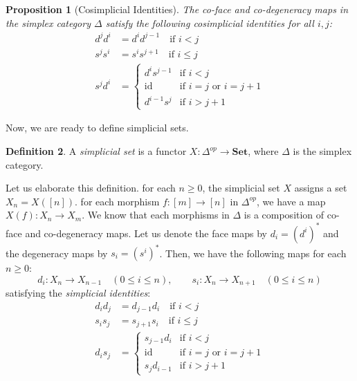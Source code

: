 \documentclass[11pt]{article}
\theoremstyle{definition}
\newtheorem{definition}{Definition}[section]
\theoremstyle{plain}
\newtheorem{proposition}[definition]{Proposition}
\begin{document}
\begin{proposition}[Cosimplicial Identities]
    The co-face and co-degeneracy maps in the simplex category $\Delta$ satisfy the following \emph{cosimplicial identities} for all $i, j$:
    \begin{align*}
        d^j d^i & = d^i d^{j-1} \quad \text{if } i < j      \\
        s^j s^i & = s^{i} s^{j+1} \quad \text{if } i \leq j \\
        s^j d^i & =
        \begin{cases}
            d^i s^{j-1} & \text{if } i < j                     \\
            \mathrm{id} & \text{if } i = j \text{ or } i = j+1 \\
            d^{i-1} s^j & \text{if } i > j+1
        \end{cases}
    \end{align*}
\end{proposition}


Now, we are ready to define simplicial sets.
\begin{definition}
    A \emph{simplicial set} is a functor $X: \Delta^{op} \to \mathbf{Set}$, where $\Delta$ is the simplex category.
\end{definition}

Let us elaborate this definition. for each $n \geq 0$, the simplicial set $X$ assigns a set $X_n = X([n])$.
for each morphism $f: [m] \to [n]$ in $\Delta^{op}$, we have a map $X(f): X_n \to X_m$.
We know that each morphisms in $\Delta$ is a composition of co-face and co-degeneracy maps. Let us denote the face maps by $d_i=(d^i)^*$ and the degeneracy maps by $s_i=(s^i)^*$. Then, we have the following maps for each $n \geq 0$:
\[
    d_i : X_n \to X_{n-1} \quad (0 \leq i \leq n), \qquad s_i : X_n \to X_{n+1} \quad (0 \leq i \leq n)
\]
satisfying the \emph{simplicial identities}:
\begin{align*}
    d_i d_j & = d_{j-1} d_i \quad \text{if } i < j    \\
    s_i s_j & = s_{j+1} s_i \quad \text{if } i \leq j \\
    d_i s_j & =
    \begin{cases}
        s_{j-1} d_i & \text{if } i < j                     \\
        \mathrm{id} & \text{if } i = j \text{ or } i = j+1 \\
        s_j d_{i-1} & \text{if } i > j+1
    \end{cases}
\end{align*}
\end{document}
